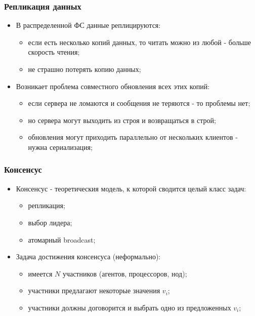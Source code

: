 \begin{frame}
\frametitle{Репликация данных}
\begin{itemize}
  \item<1-> В распределенной ФС данные реплицируются:
    \begin{itemize}
      \item если есть несколько копий данных, то читать можно из любой - больше скорость чтения;
      \item не страшно потерять копию данных;
    \end{itemize}
  \item<2-> Возникает проблема совместного обновления всех этих копий:
    \begin{itemize}
      \item если сервера не ломаются и сообщения не теряются - то проблемы нет;
      \item но сервера могут выходить из строя и возвращаться в строй;
      \item обновления могут приходить параллельно от нескольких клиентов - нужна сериализация;
    \end{itemize}
\end{itemize}
\end{frame}

\begin{frame}
\frametitle{Консенсус}
\begin{itemize}
  \item<1-> Консенсус - теоретическия модель, к которой сводится целый класс задач:
    \begin{itemize}
      \item репликация;
      \item выбор лидера;
      \item атомарный broadcast;
    \end{itemize}
  \item<2-> Задача достижения консенсуса (неформально):
    \begin{itemize}
      \item имеется $N$ участников (агентов, процессоров, нод);
      \item участники предлагают некоторые значения $v_i$;
      \item участники должны договорится и выбрать одно из предложенных $v_i$;
    \end{itemize}
\end{itemize}
\end{frame}

